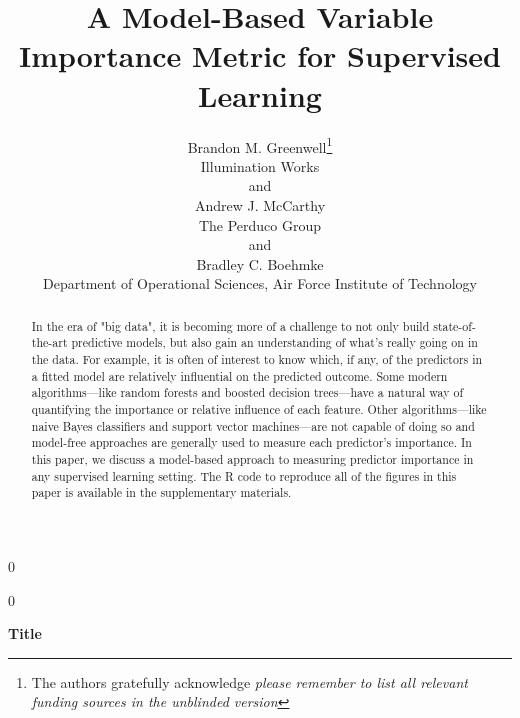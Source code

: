 \documentclass[12pt]{article}
\newcommand{\blind}{0}
\begin{document}
%

\def\spacingset#1{\renewcommand{\baselinestretch}%
{#1}\small\normalsize} \spacingset{1}



\blind
{
  \title{\bf A Model-Based Variable Importance Metric for Supervised Learning}
  \author{Brandon M. Greenwell\thanks{
    The authors gratefully acknowledge \textit{please remember to list all relevant funding sources in the unblinded version}}\hspace{.2cm}\\
    Illumination Works           \\
    and \\
    Andrew J. McCarthy \\
    The Perduco Group \\
    and \\
    Bradley C. Boehmke \\
    Department of Operational Sciences, Air Force Institute of Technology}
  \maketitle
} \fi

\blind
{
  \bigskip
  \bigskip
  \bigskip
  \begin{center}
    {\LARGE\bf Title}
\end{center}
  \medskip
} \fi

\bigskip
\begin{abstract}
In the era of "big data", it is becoming more of a challenge to not only build state-of-the-art predictive models, but also gain an understanding of what's really going on in the data. For example, it is often of interest to know which, if any, of the predictors in a fitted model are relatively influential on the predicted outcome. Some modern algorithms---like random forests and boosted decision trees---have a natural way of quantifying the importance or relative influence of each feature. Other algorithms---like naive Bayes classifiers and support vector machines---are not capable of doing so and model-free approaches are generally used to measure each predictor's importance. In this paper, we discuss a model-based approach to measuring predictor importance in any supervised learning setting. The R code to reproduce all of the figures in this paper is available in the supplementary materials.
\end{abstract}
\end{document}
